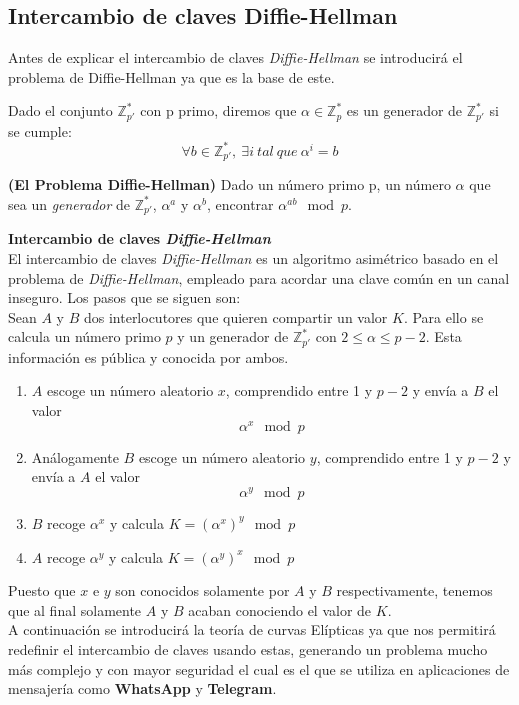 \subsection{Intercambio de claves Diffie-Hellman}
Antes de explicar el intercambio de claves \emph{Diffie-Hellman} se introducirá el problema de Diffie-Hellman ya que es la base de este.\\

\begin{definicion}
	Dado el conjunto $\mathbb{Z}^*_{p'}$ con p primo, diremos que $\alpha \in \mathbb{Z}^*_p$ es un generador de $\mathbb{Z}^*_{p'}$ si se cumple:\\
	$$
		\forall b \in \mathbb{Z}^*_{p'},\: \exists i\: tal \: que \: \alpha^i = b
	$$
\end{definicion}

\begin{definicion}
	\textbf{(El Problema Diffie-Hellman)} Dado un número primo p, un número $\alpha$ que sea un \emph{generador} de $\mathbb{Z}^*_{p'}$, $\alpha^a$ y $\alpha^b$, encontrar $\alpha^{ab} \mod p$.  
\end{definicion}

\textbf{Intercambio de claves \emph{Diffie-Hellman}}\\
El intercambio de claves \emph{Diffie-Hellman} es un algoritmo asimétrico basado en el problema de \emph{Diffie-Hellman}, empleado para acordar una clave común en un canal inseguro. Los pasos que se siguen son:\\
Sean $A$ y $B$ dos interlocutores que quieren compartir un valor $K$. Para ello se calcula un número primo $p$ y un generador \alpha de $\mathbb{Z}^*_{p'}$ con $2\leq \alpha \leq p-2$. Esta información es pública y conocida por ambos.
\begin{enumerate}
	\item $A$ escoge un número aleatorio $x$, comprendido entre 1 y $p-2$ y envía a $B$ el valor 
		$$
			\alpha^x \mod p
		$$
	\item Análogamente $B$ escoge un número aleatorio $y$, comprendido entre 1 y $p-2$ y envía a $A$ el valor 
		$$
			\alpha^y \mod p
		$$

	\item $B$ recoge $\alpha^x$ y calcula $K=(\alpha^x)^y \mod p$
	\item $A$ recoge $\alpha^y$ y calcula $K=(\alpha^y)^x \mod p$
\end{enumerate}
Puesto que $x$ e $y$ son conocidos solamente por $A$ y $B$ respectivamente, tenemos que al final solamente $A$ y $B$ acaban conociendo el valor de $K$.\\
A continuación se introducirá la teoría de curvas Elípticas ya que nos permitirá redefinir el intercambio de claves usando estas, generando un problema mucho más complejo y con mayor seguridad el cual es el que se utiliza en aplicaciones de mensajería como \textbf{WhatsApp} y \textbf{Telegram}.


